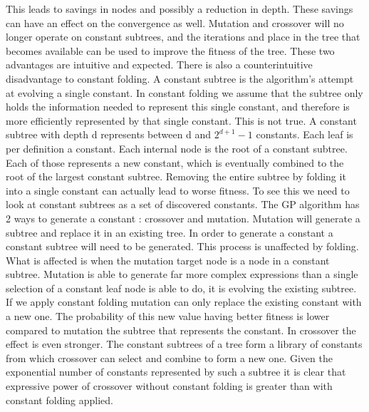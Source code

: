 This leads to savings in nodes and possibly a reduction in depth. These savings can have an effect on the convergence as well. Mutation and crossover will no longer operate on constant subtrees, and the iterations and place in the tree that becomes available can be used to improve the fitness of the tree. These two advantages are intuitive and expected. There is also a counterintuitive disadvantage to constant folding. A constant subtree is the algorithm's attempt at evolving a single constant. In constant folding we assume that the subtree only holds the information needed to represent this single constant, and therefore is more efficiently represented by that single constant. This is not true. A constant subtree with depth d represents between d and $2^{d+1}-1$ constants. Each leaf is per definition a constant. Each internal node is the root of a constant subtree. Each of those represents a new constant, which is eventually combined to the root of the largest constant subtree. Removing the entire subtree by folding it into a single constant can actually lead to worse fitness. To see this we need to look at constant subtrees as a set of discovered constants. The GP algorithm has 2 ways to generate a constant : crossover and mutation. Mutation will generate a subtree and replace it in an existing tree. In order to generate a constant a constant subtree will need to be generated. This process is unaffected by folding. What is affected is when the mutation target node is a node in a constant subtree. Mutation is able to generate far more complex expressions than a single selection of a constant leaf node is able to do, it is evolving the existing subtree. If we apply constant folding mutation can only replace the existing constant with a new one. The probability of this new value having better fitness is lower compared to mutation the subtree that represents the constant. 
In crossover the effect is even stronger. The constant subtrees of a tree form a library of constants from which crossover can select and combine to form a new one. Given the exponential number of constants represented by such a subtree it is clear that expressive power of crossover without constant folding is greater than with constant folding applied. 

